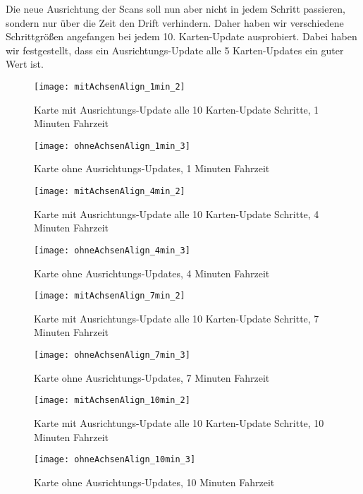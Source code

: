 Die neue Ausrichtung der Scans soll nun aber nicht in jedem Schritt passieren, sondern nur über die Zeit den Drift verhindern. Daher haben wir verschiedene Schrittgrößen angefangen bei jedem 10. Karten-Update ausprobiert. Dabei haben wir festgestellt, dass ein Ausrichtungs-Update alle 5 Karten-Updates ein guter Wert ist.

\begin{figure}
	\centering
	\texttt{[image: mitAchsenAlign\_1min\_2]}
	\caption{Karte mit Ausrichtungs-Update alle 10 Karten-Update Schritte, 1 Minuten Fahrzeit\newline}
	\label{fig:mitAchsenAlign_1min}
	\texttt{[image: ohneAchsenAlign\_1min\_3]}
	\caption{Karte ohne Ausrichtungs-Updates, 1 Minuten Fahrzeit\newline}
	\label{fig:ohneAchsenAlign_1min}
\end{figure}

\begin{figure}
	\centering
	\texttt{[image: mitAchsenAlign\_4min\_2]}
	\caption{Karte mit Ausrichtungs-Update alle 10 Karten-Update Schritte, 4 Minuten Fahrzeit\newline}
	\label{fig:mitAchsenAlign_4min}
	\texttt{[image: ohneAchsenAlign\_4min\_3]}
	\caption{Karte ohne Ausrichtungs-Updates, 4 Minuten Fahrzeit\newline}
	\label{fig:ohneAchsenAlign_4min}
\end{figure}

\begin{figure}
	\centering
	\texttt{[image: mitAchsenAlign\_7min\_2]}
	\caption{Karte mit Ausrichtungs-Update alle 10 Karten-Update Schritte, 7 Minuten Fahrzeit\newline}
	\label{fig:mitAchsenAlign_7min}
	\texttt{[image: ohneAchsenAlign\_7min\_3]}
	\caption{Karte ohne Ausrichtungs-Updates, 7 Minuten Fahrzeit\newline}
	\label{fig:ohneAchsenAlign_7min}
\end{figure}

\begin{figure}
	\centering
	\texttt{[image: mitAchsenAlign\_10min\_2]}
	\caption{Karte mit Ausrichtungs-Update alle 10 Karten-Update Schritte, 10 Minuten Fahrzeit\newline}
	\label{fig:mitAchsenAlign_10min}
	\texttt{[image: ohneAchsenAlign\_10min\_3]}
	\caption{Karte ohne Ausrichtungs-Updates, 10 Minuten Fahrzeit\newline}
	\label{fig:ohneAchsenAlign_10min}
\end{figure}